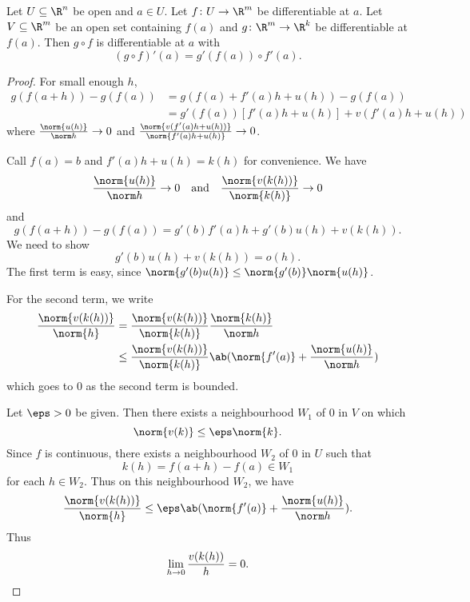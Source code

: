 \begin{proposition} \label{thm:chain}
    Let $U \subseteq \R^n$ be open and $a \in U$.
    Let $f\colon U \to \R^m$ be differentiable at $a$.
    Let $V \subseteq \R^m$ be an open set containing $f(a)$
    and $g\colon \R^m \to \R^k$ be differentiable at $f(a)$.
    Then $g \circ f$ is differentiable at $a$ with \[
        (g \circ f)'(a) = g'(f(a)) \circ f'(a).
    \]
\end{proposition}
\begin{proof}
    For small enough $h$, \begin{align*}
        g(f(a + h)) - g(f(a))
            &= g(f(a) + f'(a)h + u(h)) - g(f(a)) \\
            &= g'(f(a))[f'(a)h + u(h)] + v(f'(a)h + u(h))
    \end{align*}
    where $\frac{\norm{u(h)}}{\norm h} \to 0$ and
    $\frac{\norm{v(f'(a)h + u(h))}}{\norm{f'(a)h + u(h)}} \to 0$.

    Call $f(a) = b$ and $f'(a)h + u(h) = k(h)$ for convenience.
    We have \[
        \frac{\norm{u(h)}}{\norm h} \to 0
        \quad \text{and} \quad
        \frac{\norm{v(k(h))}}{\norm{k(h)}} \to 0
    \] and \[
        g(f(a + h)) - g(f(a)) = g'(b)f'(a)h + g'(b)u(h) + v(k(h)).
    \] We need to show \[
        g'(b) u(h) + v(k(h)) = o(h).
    \] The first term is easy, since
    $\norm{g'(b)u(h)} \le \norm{g'(b)} \norm{u(h)}$.

    For the second term, we write \begin{align*}
        \frac{\norm{v(k(h))}}{\norm{h}}
            &= \frac{\norm{v(k(h))}}{\norm{k(h)}}
                \frac{\norm{k(h)}}{\norm h} \\
            &\le \frac{\norm{v(k(h))}}{\norm{k(h)}}
                \ab(\norm{f'(a)} + \frac{\norm{u(h)}}{\norm h})
    \end{align*} which goes to $0$ as the second term is bounded.

    Let $\eps > 0$ be given.
    Then there exists a neighbourhood $W_1$ of $0$ in $V$ on which \[
        \norm{v(k)} \le \eps \norm{k}.
    \] Since $f$ is continuous, there exists a neighbourhood $W_2$ of $0$
    in $U$ such that \[
        k(h) = f(a + h) - f(a) \in W_1
    \] for each $h \in W_2$.
    Thus on this neighbourhood $W_2$, we have \[
        \frac{\norm{v(k(h))}}{\norm{h}}
        \le \eps \ab(\norm{f'(a)} + \frac{\norm{u(h)}}{\norm h}).
    \] Thus \[
        \lim_{h \to 0} \frac{v(k(h))}{h} = 0. \qedhere
    \]
\end{proof}
